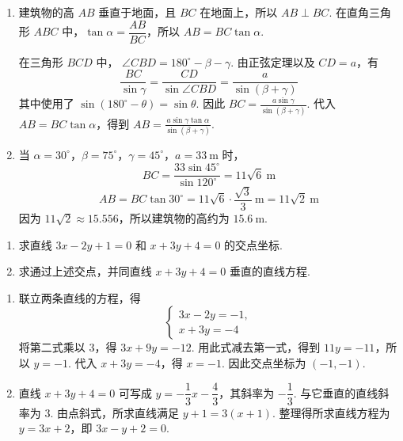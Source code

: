 \begin{solution}
\begin{enumerate}
\item 建筑物的高 \(AB\) 垂直于地面，且 \(BC\) 在地面上，所以 \(AB\perp BC\). 在直角三角形 \(ABC\) 中，\(\tan\alpha=\dfrac{AB}{BC}\)，所以 \(AB=BC\tan\alpha\).

在三角形 \(BCD\) 中，
\(\angle CBD=180^\circ-\beta-\gamma\).
由正弦定理以及 \(CD=a\)，有
\[
\frac{BC}{\sin\gamma}
=\frac{CD}{\sin\angle CBD}
=\frac{a}{\sin\left(\beta+\gamma\right)}
\]
其中使用了 \(\sin\left(180^\circ-\theta\right)=\sin\theta\). 因此
\(BC=\frac{a\sin\gamma}{\sin\left(\beta+\gamma\right)}\).
代入 \(AB=BC\tan\alpha\)，得到
\(AB=\frac{a\sin\gamma\tan\alpha}{\sin\left(\beta+\gamma\right)}\).

\item 当 \(\alpha=30^\circ\)，\(\beta=75^\circ\)，\(\gamma=45^\circ\)，\(a=33\mathrm{~m}\) 时，
\[
BC=\frac{33\sin45^\circ}{\sin120^\circ}=11\sqrt{6}\mathrm{~m}
\]
\[
AB=BC\tan30^\circ
=11\sqrt{6}\cdot\frac{\sqrt{3}}{3}\mathrm{~m}
=11\sqrt{2}\mathrm{~m}
\]
因为 \(11\sqrt{2}\approx15.556\)，所以建筑物的高约为 \(15.6\mathrm{~m}\).
\end{enumerate}
\end{solution}

\begin{problem}
\begin{enumerate}
\item 求直线 \(3x-2y+1=0\) 和 \(x+3y+4=0\) 的交点坐标.

\item 求通过上述交点，并同直线 \(x+3y+4=0\) 垂直的直线方程.

\end{enumerate}
\end{problem}

\begin{solution}
\begin{enumerate}
\item 联立两条直线的方程，得
\[
\begin{cases}
3x-2y=-1,\\
x+3y=-4
\end{cases}
\]
将第二式乘以 \(3\)，得 \(3x+9y=-12\). 用此式减去第一式，得到 \(11y=-11\)，所以 \(y=-1\). 代入 \(x+3y=-4\)，得 \(x=-1\). 因此交点坐标为 \(\left(-1,-1\right)\).

\item 直线 \(x+3y+4=0\) 可写成 \(y=-\dfrac{1}{3}x-\dfrac{4}{3}\)，其斜率为 \(-\dfrac{1}{3}\). 与它垂直的直线斜率为 \(3\). 由点斜式，所求直线满足
\(y+1=3\left(x+1\right)\).
整理得所求直线方程为 \(y=3x+2\)，即 \(3x-y+2=0\).
\end{enumerate}
\end{solution}

